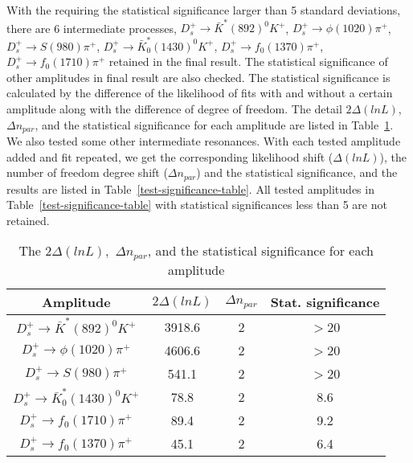 {With the requiring the statistical significance larger than 5 standard deviations, there are 6 intermediate processes, 
$D_{s}^{+} \rightarrow \bar{K}^{*}(892)^{0}K^{+}$,
$D_{s}^{+} \rightarrow \phi(1020)\pi^{+}$,
$D_{s}^{+} \rightarrow S(980)\pi^{+}$,
$D_{s}^{+} \rightarrow \bar{K}^{*}_{0}(1430)^{0}K^{+}$,
$D_{s}^{+} \rightarrow f_{0}(1370)\pi^{+}$,
$D_{s}^{+} \rightarrow f_{0}(1710)\pi^{+}$ 
retained in the final result. The statistical significance of other amplitudes in final result are also checked.
The statistical significance is calculated by the difference of the likelihood of fits with and without a certain amplitude along with the difference of degree of freedom.
The detail $2\Delta(lnL)$, $\Delta n_{par}$, and the statistical significance for each amplitude are  listed in Table~\ref{significance-table}.
We also tested some other intermediate resonances. With each tested amplitude added and fit repeated, we get the corresponding likelihood shift ($\Delta(lnL)$), the number of freedom degree shift ($\Delta n_{par}$) and the statistical significance, and the results are listed in Table~\ref{test-significance-table}.
All tested amplitudes in Table~\ref{test-significance-table}  with statistical significances less than 5 are not retained. 
\begin{table}[htbp]
    \caption{The $2\Delta(lnL)$,~$\Delta n_{par}$, and the statistical significance for each amplitude}
    \label{significance-table}
    \begin{center}
        \begin{tabular}{cccc}
            \toprule
            Amplitude & $2\Delta(lnL)$ & $\Delta n_{par}$ & Stat. significance\\
            \hline
            $D_{s}^{+} \rightarrow \bar{K}^{*}(892)^{0}K^{+}$              & 3918.6     & 2   & $>$20\\
            $D_{s}^{+} \rightarrow \phi(1020)\pi^{+}$                      & 4606.6     & 2   & $>$20\\
            $D_{s}^{+} \rightarrow S(980)\pi^{+}$                           & 541.1      & 2   & $>$20\\
            $D_{s}^{+} \rightarrow \bar{K}^{*}_{0}(1430)^{0}K^{+}$         & 78.8       & 2   & 8.6\\
            $D_{s}^{+} \rightarrow f_{0}(1710)\pi^{+}$                     & 89.4       & 2   & 9.2\\
            $D_{s}^{+} \rightarrow f_{0}(1370)\pi^{+}$                     & 45.1       & 2   & 6.4\\
            \bottomrule
        \end{tabular}
    \end{center}
\end{table}

}
